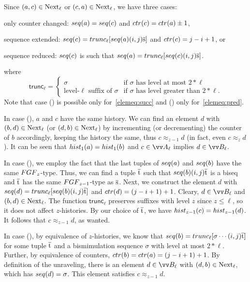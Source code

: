 \begin{proofsketch}
  Since $(a,c) \in \mathrm{Next}_{\ell}$ or $(c,a) \in \mathrm{Next}_{\ell}$, we have three cases:
  \begin{romanenumerate}
    \item only counter changed: $\seq{a} = \seq{c}$ and $\ctr{c} = \ctr{a} \pm 1$,
    \item sequence extended: $\seq{c} = \mathsf{trunc}_{\ell}[\seq{a} (i,j) \elemtuples]$ and $\ctr{c} = j-i+1$, or
    \item sequence reduced: $\seq{c}$ is such that $\seq{a} = \mathsf{trunc}_{\ell}[\seq{c} (i,j) \elemtuples]$.
  \end{romanenumerate}
  where
  \begin{displaymath}
    \mathsf{trunc}_{\ell} =
    \begin{cases}
      \sigma & \text{if $\sigma$ has level at most $2 * \ell$} \\
      \text{level-$\ell$ suffix of $\sigma$} & \text{if $\sigma$ has level greater than $2 * \ell$.}
    \end{cases}
  \end{displaymath}
  Note that case () is possible only for~\ref{elemeq:succ} and () only for~\ref{elemeq:pred}.

  In case (), $a$ and $c$ have the same history.
  We can find an element $d$ with $(b,d) \in \mathrm{Next}_{\ell}$ (or $(d,b) \in \mathrm{Next}_{\ell}$) by incrementing (or decrementing) the counter of $b$ accordingly, keeping the history the same, thus $c \approx_{z-1} d$ (in fact, even $c \approx_{z} d$).
  It can be seen that $\hist{1}{a} = \hist{1}{b}$ and $c \in \unraveldom{A}_{\ell}$ implies $d \in \unraveldom{B}_{\ell}$.

  In case (), we employ the fact that the last tuples of $\seq{a}$ and $\seq{b}$ have the same $\FGF_{z}$-type.
  Thus, we can find a tuple $\overline{\mathrm{t}}$ such that $\seq{b} (i,j) \elemtuplet$ is a biseq and $\overline{\mathrm{t}}$ has the same $\FGF_{z-1}$-type as $\overline{\mathrm{s}}$.
  Next, we construct the element $d$ with $\seq{d} = \mathsf{trunc}_{\ell}[\seq{b}(i,j)\elemtuplet]$ and $\ctr{d} = (j-i+1) + 1$.
  Cleary, $d \in \unraveldom{B}_{\ell}$ and $(b,d) \in \mathrm{Next}_{\ell}$.
  The function $\mathsf{trunc}_{\ell}$ preserves suffixes with level $z$ since $z \le \ell$, so it does not affect $z$-histories.
  By our choice of $\overline{\mathrm{t}}$, we have $\hist{z-1}{c} = \hist{z-1}{d}$.
  It follows that $c \approx_{z-1} d$, as wanted.

  In case (), by equivalence of $z$-histories, we know that $\seq{b} = \mathsf{trunc}_{\ell}[\sigma \cdots(i,j)\elemtuplet]$ for some tuple $\overline{\mathrm{t}}$ and a bismimulation sequence $\sigma$ with level at most $2 * \ell$.
  Further, by equivalence of counters, $\ctr{b} = \ctr{a} = (j-i+1) + 1$.
  By definition of the unraveling, there is an element $d \in \unraveldom{B}_{\ell}$ with $(d,b) \in \mathrm{Next}_{\ell}$, which has $\seq{d} = \sigma$.
  This element satisfies $c \approx_{z-1} d$.
\end{proofsketch}
